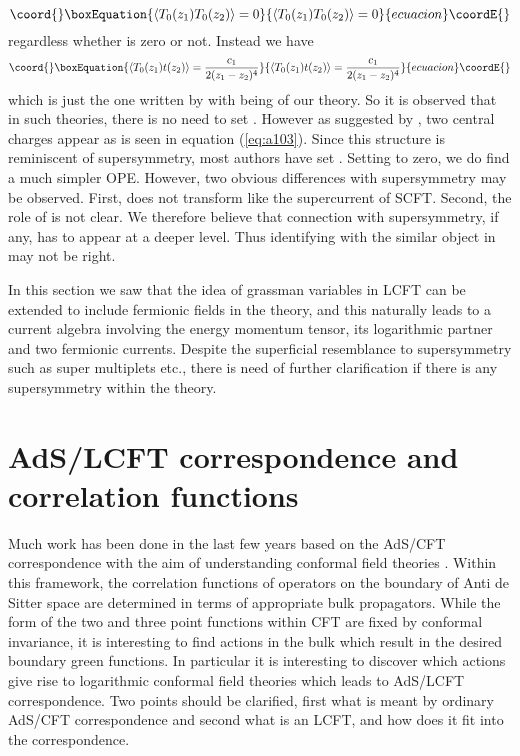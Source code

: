 \documentclass[a4paper,11pt]{article}
\begin{document}
\begin{equation}\coord{}\boxEquation{\label{eq:a110}
\langle T_0(z_1)T_0(z_2) \rangle =0
}{\langle T_0(z_1)T_0(z_2) \rangle =0
}{ecuacion}\coordE{}\end{equation}
regardless whether \coordHE{} is zero or not. Instead we have
\begin{equation}\coord{}\boxEquation{\label{eq:a111}
\langle T_0(z_1)t(z_2)\rangle = \frac{c_1}{2(z_1-z_2)^4}
}{\langle T_0(z_1)t(z_2)\rangle = \frac{c_1}{2(z_1-z_2)^4}
}{ecuacion}\coordE{}\end{equation}
which is just the one written by \cite{lud} with \coordHE{} being \coordHE{}
of our theory. So it is observed that in such theories, there is
no need to set \coordHE{}. However as suggested by \cite{lud}, two
central charges appear as is seen in equation (\ref{eq:a103}).
Since this structure is reminiscent of supersymmetry, most
authors have set \coordHE{}. Setting \coordHE{} to zero, we do find a
much simpler OPE. However, two obvious differences with
supersymmetry may be observed. First, \myHighlight{$\zeta$}\coordHE{} does not transform
like the supercurrent of SCFT. Second, the role of \coordHE{} is not
clear. We therefore believe that connection with supersymmetry,
if any, has to appear at a deeper level. Thus identifying \coordHE{}
with the similar object in \cite{lud} may not be right.

In this section we saw that the idea of grassman variables in
LCFT can be extended to include fermionic fields in the theory,
and this naturally leads to a current algebra involving the energy
momentum tensor, its logarithmic partner and two fermionic
currents. Despite the superficial resemblance to supersymmetry
such as super multiplets etc., there is need of further
clarification if there is any supersymmetry within the theory.
\section{AdS/LCFT correspondence and correlation functions}
Much work has been done in the last few years based on the AdS/CFT
correspondence with the aim of understanding conformal field
theories \cite{aha}. Within this framework, the correlation
functions of operators on the boundary of Anti de Sitter space
are determined in terms of appropriate bulk propagators. While
the form of the two and three point functions within CFT are
fixed by conformal invariance, it is interesting to find actions
in the bulk which result in the desired boundary green functions.
In particular it is interesting to discover which actions give
rise to logarithmic conformal field theories which leads to
AdS/LCFT correspondence. Two points should be clarified, first
what is meant by ordinary AdS/CFT correspondence and second what
is an LCFT, and how does it fit into the correspondence.
\end{document}
